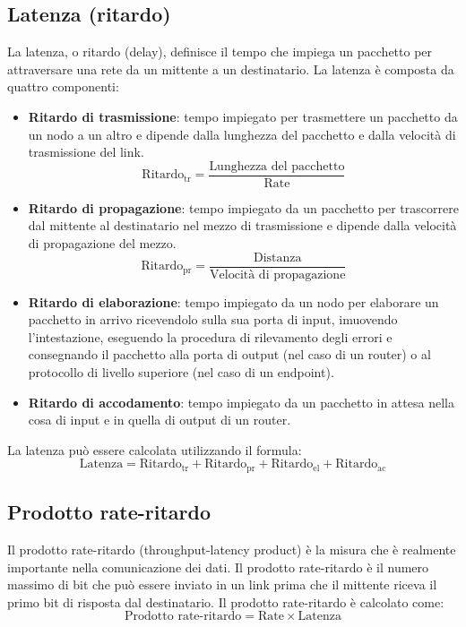 \documentclass[12pt]{report}
\begin{document}
	\subsection{Latenza (ritardo)}
	La latenza, o ritardo (delay), definisce il tempo che impiega un pacchetto per attraversare una rete da un mittente a un destinatario. La latenza è composta da quattro componenti:
	\begin{itemize}
		\item \textbf{Ritardo di trasmissione}: tempo impiegato per trasmettere un pacchetto da un nodo a un altro e dipende dalla lunghezza del pacchetto e dalla velocità di trasmissione del link.
		\[
			\text{Ritardo}_{\text{tr}} = \frac{\text{Lunghezza del pacchetto}}{\text{Rate}}
		\]
		\item \textbf{Ritardo di propagazione}: tempo impiegato da un pacchetto per trascorrere dal mittente al destinatario nel mezzo di trasmissione e dipende dalla velocità di propagazione del mezzo.		
		\[
			\text{Ritardo}_{\text{pr}} = \frac{\text{Distanza}}{\text{Velocità di propagazione}}
		\]
		\item \textbf{Ritardo di elaborazione}: tempo impiegato da un nodo per elaborare un pacchetto in arrivo ricevendolo sulla sua porta di input, imuovendo l'intestazione, eseguendo la procedura di rilevamento degli errori e consegnando il pacchetto alla porta di output (nel caso di un router) o al protocollo di livello superiore (nel caso di un endpoint).
		\item \textbf{Ritardo di accodamento}: tempo impiegato da un pacchetto in attesa nella cosa di input e in quella di output di un router.
	\end{itemize}
	La latenza può essere calcolata utilizzando il formula:
    \[
		\text{Latenza} = \text{Ritardo}_{\text{tr}} + \text{Ritardo}_{\text{pr}} + \text{Ritardo}_{\text{el}} + \text{Ritardo}_{\text{ac}}
	\]

	\subsection{Prodotto rate-ritardo}
	Il prodotto rate-ritardo (throughput-latency product) è la misura che è realmente importante nella comunicazione dei dati. Il prodotto rate-ritardo è il numero massimo di bit che può essere inviato in un link prima che il mittente riceva il primo bit di risposta dal destinatario. Il prodotto rate-ritardo è calcolato come:
	\[
        \text{Prodotto rate-ritardo} = \text{Rate} \times \text{Latenza}
    \] 
\end{document}
